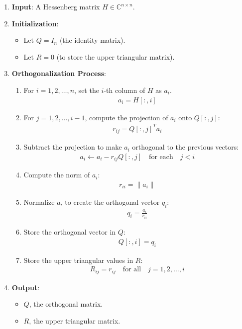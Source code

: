 \documentclass[12pt]{article}
\numberwithin{equation}{subsubsection}
\begin{document}
\begin{enumerate}
	\item \textbf{Input}: A Hessenberg matrix $ H \in \mathbb{C}^{n \times n} $.
	\item \textbf{Initialization}:
	      \begin{itemize}
	      	\item Let $ Q = I_n $ (the identity matrix).
	      	\item Let $ R = 0 $ (to store the upper triangular matrix).
	      \end{itemize}
	\item \textbf{Orthogonalization Process}:
	      \begin{enumerate}
	      	\item For $ i = 1, 2, \dots, n $, set the $ i $-th column of $ H $ as $ a_i $.
	      	      \begin{align}
	      	      	a_i = H[:, i]
	      	      \end{align}
	      	\item For $ j = 1, 2, \dots, i-1 $, compute the projection of $ a_i $ onto $ Q[:, j] $:
	      	      \begin{align}
	      	      	r_{ij} = Q[:, j]^T a_i
	      	      \end{align}
	      	\item Subtract the projection to make $ a_i $ orthogonal to the previous vectors:
	      	      \begin{align}
	      	      	a_i \gets a_i - r_{ij} Q[:, j] \quad \text{for each} \quad j < i
	      	      \end{align}
	      	\item Compute the norm of $ a_i $:
	      	      \begin{align}
	      	      	r_{ii} = \|a_i\|
	      	      \end{align}
	      	\item Normalize $ a_i $ to create the orthogonal vector $ q_i $:
	      	      \begin{align}
	      	      	q_i = \frac{a_i}{r_{ii}}
	      	      \end{align}
	      	\item Store the orthogonal vector in $ Q $:
	      	      \begin{align}
	      	      	Q[:, i] = q_i
	      	      \end{align}
	      	\item Store the upper triangular values in $ R $:
	      	      \begin{align}
	      	      	R_{ij} = r_{ij} \quad \text{for all} \quad j = 1, 2, \dots, i
	      	      \end{align}
	      \end{enumerate}
	\item \textbf{Output}:
	      \begin{itemize}
	      	\item $ Q $, the orthogonal matrix.
	      	\item $ R $, the upper triangular matrix.
	      \end{itemize}
\end{enumerate}
\end{document}
